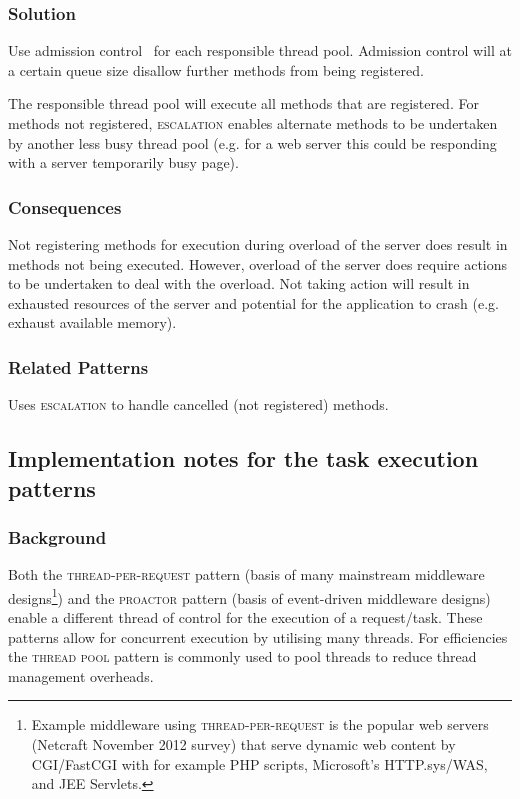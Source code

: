 \documentclass[prodmode]{style/acmlarge}
\begin{document}
\subsubsection*{\textbf{Solution}} Use admission control~\cite{seda} for each responsible
thread pool.  Admission control will at a certain queue size disallow further
methods from being registered.

The responsible thread pool will execute all methods that are registered.  For
methods not registered, \textsc{escalation} enables alternate methods to be
undertaken by another less busy thread pool (e.g. for a web server this could be
responding with a server temporarily busy page).

\subsubsection*{Consequences} Not registering methods for execution during
overload of the server does result in methods not being executed.  However,
overload of the server does require actions to be undertaken to deal with the
overload.  Not taking action will result in exhausted resources of the server
and potential for the application to crash (e.g. exhaust available memory).

\subsubsection*{Related Patterns} Uses \textsc{escalation} to handle cancelled
(not registered) methods.



\subsection{Implementation notes for the task execution patterns}

\subsubsection*{Background}

Both the \textsc{thread-per-request} pattern \cite{thread-per-request} (basis of
many mainstream middleware designs\footnote{Example middleware using
\textsc{thread-per-request} is the popular web servers (Netcraft November 2012
survey) that serve dynamic web content by CGI/FastCGI with for example PHP scripts,
Microsoft's HTTP.sys/WAS, and JEE Servlets.}) and the \textsc{proactor} pattern
\cite{proactor} (basis of event-driven middleware designs) enable a different
thread of control for the execution of a request/task.  These patterns allow for
concurrent execution by utilising many threads.  For efficiencies the
\textsc{thread pool} pattern \cite{thread-per-request} is commonly used to pool
threads to reduce thread management overheads.
\end{document}
